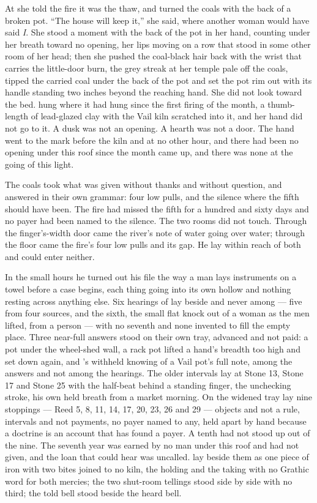 \scenebreak

At  she told the fire it was the thaw, and turned the coals with the back of a broken pot. “The house will keep it,” she said, where another woman would have said \emph{I}. She stood a moment with the back of the pot in her hand, counting under her breath toward no opening, her lips moving on a row that stood in some other room of her head; then she pushed the coal-black hair back with the wrist that carries the little-door burn, the grey streak at her temple pale off the coals, tipped the carried coal under the back of the pot and set the pot rim out with its handle standing two inches beyond the reaching hand. She did not look toward the bed.  hung where it had hung since the first firing of the month, a thumb-length of lead-glazed clay with the Vail kiln scratched into it, and her hand did not go to it. A dusk was not an opening. A hearth was not a door. The hand went to the mark before the kiln and at no other hour, and there had been no opening under this roof since the month came up, and there was none at the going of this light.

The coals took what was given without thanks and without question, and answered in their own grammar: four low pulls, and the silence where the fifth should have been. The fire had missed the fifth for a hundred and sixty days and no payer had been named to the silence. The two rooms did not touch. Through the finger's-width door came the river's note of water going over water; through the floor came the fire's four low pulls and its gap. He lay within reach of both and could enter neither.

\scenebreak

In the small hours he turned out his file the way a man lays instruments on a towel before a case begins, each thing going into its own hollow and nothing resting across anything else. Six hearings of  lay beside and never among --- five from four sources, and the sixth, the small flat knock out of a woman as the men lifted, from a person --- with no seventh and none invented to fill the empty place. Three near-full answers stood on their own tray, advanced and not paid: a pot under the wheel-shed wall, a rack pot lifted a hand's breadth too high and set down again, and 's withheld knowing of a Vail pot's full note, among the answers and not among the hearings. The older intervals lay at Stone 13, Stone 17 and Stone 25 with the half-beat behind a standing finger, the unchecking stroke, his own held breath from a market morning. On the widened tray lay nine stoppings --- Reed 5, 8, 11, 14, 17, 20, 23, 26 and 29 --- objects and not a rule, intervals and not payments, no payer named to any, held apart by hand because a doctrine is an account that has found a payer. A tenth had not stood up out of the nine. The seventh year was earned by no man under this roof and had not given, and the loan that could hear was uncalled.  lay beside them as one piece of iron with two bites joined to no kiln, the holding and the taking with no Grathic word for both mercies; the two shut-room tellings stood side by side with no third; the told bell stood beside the heard bell.

